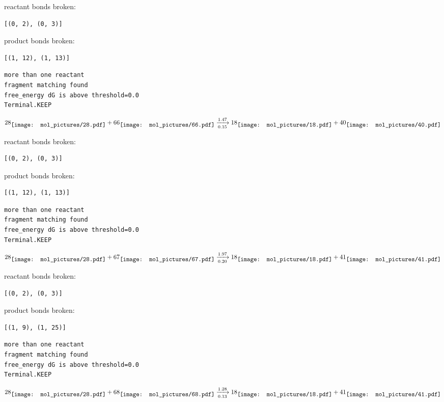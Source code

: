 \documentclass{article}
\begin{document}
reactant bonds broken:\begin{verbatim}
[(0, 2), (0, 3)]
\end{verbatim}
product bonds broken:\begin{verbatim}
[(1, 12), (1, 13)]
\end{verbatim}




\vspace{1cm}
\begin{verbatim}
more than one reactant
fragment matching found
free_energy dG is above threshold=0.0
Terminal.KEEP
\end{verbatim}
$$
28
\raisebox{-.5\height}{\texttt{[image: mol\_pictures/28.pdf]}}
+
66
\raisebox{-.5\height}{\texttt{[image: mol\_pictures/66.pdf]}}
\xrightarrow[0.15]{1.47}
18
\raisebox{-.5\height}{\texttt{[image: mol\_pictures/18.pdf]}}
+
40
\raisebox{-.5\height}{\texttt{[image: mol\_pictures/40.pdf]}}
$$


reactant bonds broken:\begin{verbatim}
[(0, 2), (0, 3)]
\end{verbatim}
product bonds broken:\begin{verbatim}
[(1, 12), (1, 13)]
\end{verbatim}




\vspace{1cm}
\begin{verbatim}
more than one reactant
fragment matching found
free_energy dG is above threshold=0.0
Terminal.KEEP
\end{verbatim}
$$
28
\raisebox{-.5\height}{\texttt{[image: mol\_pictures/28.pdf]}}
+
67
\raisebox{-.5\height}{\texttt{[image: mol\_pictures/67.pdf]}}
\xrightarrow[0.20]{1.97}
18
\raisebox{-.5\height}{\texttt{[image: mol\_pictures/18.pdf]}}
+
41
\raisebox{-.5\height}{\texttt{[image: mol\_pictures/41.pdf]}}
$$


reactant bonds broken:\begin{verbatim}
[(0, 2), (0, 3)]
\end{verbatim}
product bonds broken:\begin{verbatim}
[(1, 9), (1, 25)]
\end{verbatim}




\vspace{1cm}
\begin{verbatim}
more than one reactant
fragment matching found
free_energy dG is above threshold=0.0
Terminal.KEEP
\end{verbatim}
$$
28
\raisebox{-.5\height}{\texttt{[image: mol\_pictures/28.pdf]}}
+
68
\raisebox{-.5\height}{\texttt{[image: mol\_pictures/68.pdf]}}
\xrightarrow[0.13]{1.28}
18
\raisebox{-.5\height}{\texttt{[image: mol\_pictures/18.pdf]}}
+
41
\raisebox{-.5\height}{\texttt{[image: mol\_pictures/41.pdf]}}
$$
\end{document}
